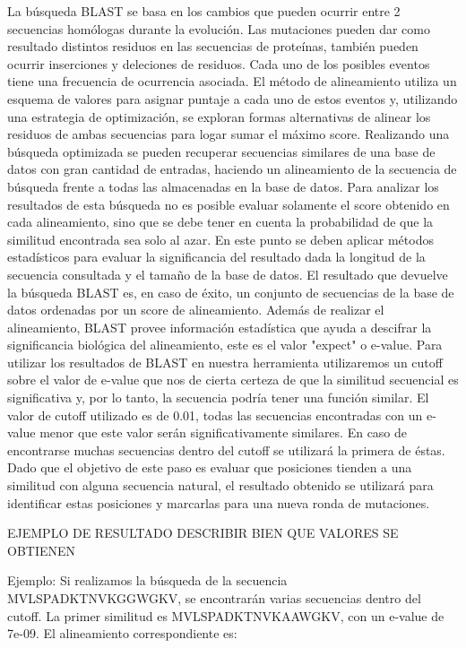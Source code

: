 La búsqueda BLAST se basa en los cambios que pueden ocurrir entre 2 secuencias homólogas durante la evolución. Las mutaciones pueden dar como resultado distintos residuos en las secuencias de proteínas, también pueden ocurrir inserciones y deleciones de residuos. Cada uno de los posibles eventos tiene una frecuencia de ocurrencia asociada. El método de alineamiento utiliza un esquema de valores para asignar puntaje a cada uno de estos eventos y,  utilizando una estrategia de optimización, se exploran formas alternativas de alinear los residuos de ambas secuencias para logar sumar el máximo score.
Realizando una búsqueda optimizada se pueden recuperar secuencias similares de una base de datos con gran cantidad de entradas, haciendo un alineamiento de la secuencia de búsqueda frente a todas las almacenadas en la base de datos. Para analizar los resultados de esta búsqueda no es posible evaluar solamente el score obtenido en cada alineamiento, sino que se debe tener en cuenta la probabilidad de que la similitud encontrada sea solo al azar. En este punto se deben aplicar métodos estadísticos para evaluar la significancia del resultado dada la longitud de la secuencia consultada y el tamaño de la base de datos.
El resultado que devuelve la búsqueda BLAST es, en caso de éxito, un conjunto de secuencias de la base de datos ordenadas por un score de alineamiento. Además de realizar el alineamiento, BLAST provee información estadística que ayuda a descifrar la significancia biológica del alineamiento, este es el valor "expect" o e-value. Para utilizar los resultados de BLAST en nuestra herramienta utilizaremos un cutoff sobre el valor de e-value que nos de cierta certeza de que la similitud secuencial es significativa y, por lo tanto, la secuencia podría tener una función similar. El valor de cutoff utilizado es de 0.01, todas las secuencias encontradas con un e-value menor que este valor serán significativamente similares. En caso de encontrarse muchas secuencias dentro del cutoff se utilizará la primera de éstas.
Dado que el objetivo de este paso es evaluar que posiciones tienden a una similitud con alguna secuencia natural, el resultado obtenido se utilizará para identificar estas posiciones y marcarlas para una nueva ronda de mutaciones.

EJEMPLO DE RESULTADO
DESCRIBIR BIEN QUE VALORES SE OBTIENEN

Ejemplo:
Si realizamos la búsqueda de la secuencia MVLSPADKTNVKGGWGKV, se encontrarán varias secuencias dentro del cutoff. La primer similitud es MVLSPADKTNVKAAWGKV, con un e-value de 7e-09. El alineamiento correspondiente es:

